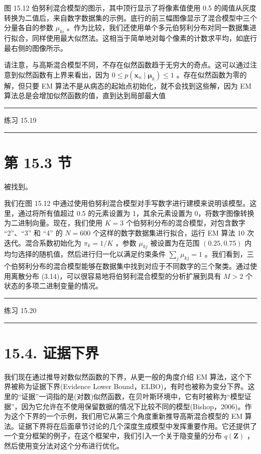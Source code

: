 \documentclass[10pt]{report}
\newcommand{\HRule}{\begin{center}\rule{0.9\linewidth}{0.2mm}\end{center}}
\begin{document}
图 15.12 伯努利混合模型的图示，其中顶行显示了将像素值使用 0.5 的阈值从灰度转换为二值后，来自数字数据集的示例。底行的前三幅图像显示了混合模型中三个分量各自的参数 \({\mu }_{ki}\) 。作为比较，我们还使用单个多元伯努利分布对同一数据集进行拟合，同样使用最大似然法。这相当于简单地对每个像素的计数求平均，如底行最右侧的图像所示。

请注意，与高斯混合模型不同，不存在似然函数趋于无穷大的奇点。这可以通过注意到似然函数有上界来看出，因为 \(0 \leq  p\left( {{\mathbf{x}}_{n} \mid  {\mathbf{\mu }}_{k}}\right)  \leq  1\) 。存在似然函数为零的解，但只要 EM 算法不是从病态的起始点初始化，就不会找到这些解，因为 EM 算法总是会增加似然函数的值，直到达到局部最大值

\HRule

练习 15.19

\HRule

\section*{第 15.3 节}

被找到。

我们在图 15.12 中通过使用伯努利混合模型对手写数字进行建模来说明该模型。这里，通过将所有值超过 0.5 的元素设置为 1，其余元素设置为 0，将数字图像转换为二进制向量。现在，我们使用 \(K = 3\) 个伯努利分布的混合模型，对包含数字 “2”、“3” 和 “4” 的 \(N = {600}\) 个这样的数字数据集进行拟合，运行 EM 算法 10 次迭代。混合系数初始化为 \({\pi }_{k} = 1/K\) ，参数 \({\mu }_{kj}\) 被设置为在范围 \(\left( {{0.25},{0.75}}\right)\) 内均匀选择的随机值，然后进行归一化以满足约束条件 \(\mathop{\sum }\limits_{j}{\mu }_{kj} = 1\) 。我们看到，三个伯努利分布的混合模型能够在数据集中找到对应于不同数字的三个聚类。通过使用离散分布 (3.14)，可以很容易地将伯努利混合模型的分析扩展到具有 \(M > 2\) 个状态的多项二进制变量的情况。

\HRule

练习 15.20

\HRule

\section*{15.4. 证据下界}

我们现在通过推导对数似然函数的下界，从更一般的角度介绍 EM 算法，这个下界被称为证据下界(Evidence Lower Bound，ELBO)，有时也被称为变分下界。这里的“证据”一词指的是(对数)似然函数，在贝叶斯环境中，它有时被称为“模型证据”，因为它允许在不使用保留数据的情况下比较不同的模型(Bishop，2006)。作为这个下界的一个示例，我们用它从第三个角度重新推导高斯混合模型的 EM 算法。证据下界将在后面章节讨论的几个深度生成模型中发挥重要作用。它还提供了一个变分框架的例子，在这个框架中，我们引入一个关于隐变量的分布 \(q\left( \mathbf{Z}\right)\) ，然后使用变分法对这个分布进行优化。
\end{document}
